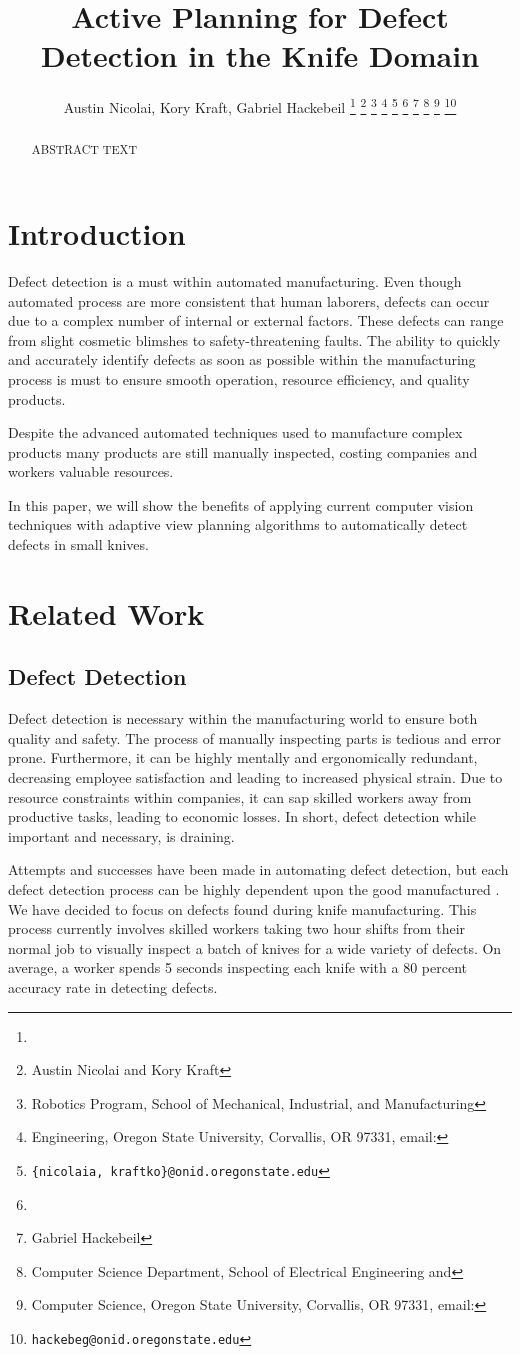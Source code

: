 \documentclass[letterpaper, 10 pt, conference]{ieeeconf}  %
\title{\LARGE \bf 
Active Planning for Defect Detection in the Knife Domain
}
\author{Austin Nicolai, Kory Kraft, Gabriel Hackebeil%
\thanks{\hrulefill}
\thanks{Austin Nicolai and Kory Kraft}
\thanks{Robotics Program, School of Mechanical, Industrial, and Manufacturing}
\thanks{Engineering, Oregon State University, Corvallis, OR 97331, email: }
\thanks{{\tt\small \{nicolaia, kraftko\}@onid.oregonstate.edu}}
\thanks{\hfill}
\thanks{Gabriel Hackebeil}
\thanks{Computer Science Department, School of Electrical Engineering and}
\thanks{Computer Science, Oregon State University, Corvallis, OR 97331, email: }
\thanks{{\tt\small hackebeg@onid.oregonstate.edu}}
}
\begin{document}
\maketitle
\thispagestyle{empty}
\pagestyle{empty}

\begin{abstract}
ABSTRACT TEXT
\end{abstract}


\section{Introduction}

Defect detection is a must within automated manufacturing. Even though automated process are more consistent that human laborers, defects can occur due to a complex number of internal or external factors.  These defects can range from slight cosmetic blimshes to safety-threatening faults. The ability to quickly and accurately identify defects as soon as possible within the manufacturing process is must to ensure smooth operation, resource efficiency, and quality products.

Despite the advanced automated techniques used to manufacture complex products many products are still manually inspected, costing companies and workers valuable resources.

In this paper, we will show the benefits of applying current computer vision techniques with adaptive view planning algorithms to automatically detect defects in small knives.

\section{Related Work}

\subsection{Defect Detection}
Defect detection is necessary within the manufacturing world to ensure both quality and safety. The process of manually inspecting parts is tedious and error prone. Furthermore, it can be highly mentally and ergonomically redundant, decreasing employee satisfaction and leading to increased physical strain. Due to resource constraints within companies, it can sap skilled workers away from productive tasks, leading to economic losses. In short, defect detection while important and necessary, is draining.

Attempts and successes have been made in automating defect detection, but each defect detection process can be highly dependent upon the good manufactured \cite{defectGabor}\cite{defectSewer}. We have decided to focus on defects found during knife manufacturing. This process currently involves skilled workers taking two hour shifts from their normal job to visually inspect a batch of knives for a wide variety of defects. On average, a worker spends 5 seconds inspecting each knife with a 80 percent accuracy rate in detecting defects.
\end{document}
